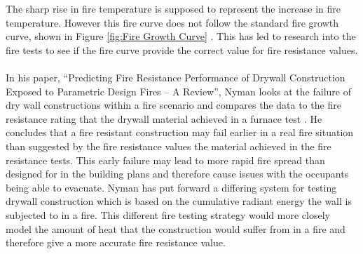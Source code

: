 \documentclass[table,a4paper,oneside]{book}
\begin{document}
The sharp rise in fire temperature is supposed to represent the increase in fire temperature. However this fire curve does not follow the standard fire growth curve, shown in Figure \ref{fig:Fire Growth Curve} \citep{Drysdale1998}. This has led to research into the fire tests to see if the fire curve provide the correct value for fire resistance values.
\\
\\
In his paper, ``Predicting Fire Resistance Performance of Drywall Construction Exposed to Parametric Design Fires -- A Review'', Nyman looks at the failure of dry wall constructions within a fire scenario and compares the data to the fire resistance rating that the drywall material achieved in a furnace test \citep{JonathanF.Nyman05012008}. He concludes that a fire resistant construction may fail earlier in a real fire situation than suggested by the fire resistance values the material achieved in the fire resistance tests. This early failure may lead to more rapid fire spread than designed for in the building plans and therefore cause issues with the occupants being able to evacuate. Nyman has put forward a differing system for testing drywall construction which is based on the cumulative radiant energy the wall is subjected to in a fire. This different fire testing strategy would more closely model the amount of heat that the construction would suffer from in a fire and therefore give a more accurate fire resistance value.
\end{document}
